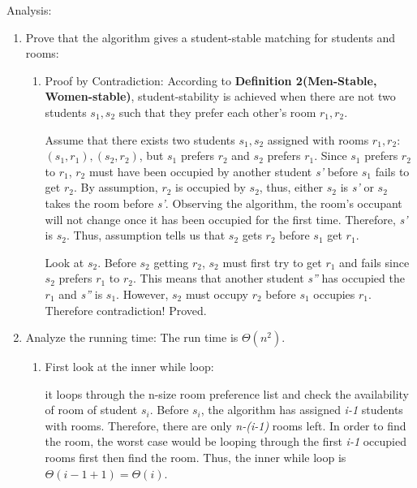 \documentclass{homework}
\begin{document}
\begin{enumerate}
    Analysis:
    \begin{enumerate}
        \item Prove that the algorithm gives a student-stable matching for students and rooms:

        \begin{enumerate}
            \item Proof by Contradiction:
            According to \textbf{Definition 2(Men-Stable, Women-stable)}, student-stability is achieved when there are not two students \textit{$s_1, s_2$} such that they prefer each other's room \textit{$r_1, r_2$}.
        
            Assume that there exists two students \textit{$s_1, s_2$} assigned with rooms \textit{$r_1, r_2$}: \textit{$(s_1, r_1), (s_2, r_2)$}, but \textit{$s_1$} prefers \textit{$r_2$} and \textit{$s_2$} prefers \textit{$r_1$}. Since \textit{$s_1$} prefers \textit{$r_2$} to \textit{$r_1$}, \textit{$r_2$} must have been occupied by another student \textit{s'} before \textit{$s_1$} fails to get \textit{$r_2$}. By assumption, \textit{$r_2$} is occupied by \textit{$s_2$}, thus, either \textit{$s_2$} is \textit{s'} or \textit{$s_2$} takes the room before \textit{s'}. Observing the algorithm, the room's occupant will not change once it has been occupied for the first time. Therefore, \textit{s'} is \textit{$s_2$}. Thus, assumption tells us that \textit{$s_2$} gets \textit{$r_2$} before \textit{$s_1$} get \textit{$r_1$}.
        
            Look at \textit{$s_2$}. Before \textit{$s_2$} getting \textit{$r_2$}, \textit{$s_2$} must first try to get \textit{$r_1$} and fails since \textit{$s_2$} prefers \textit{$r_1$} to \textit{$r_2$}. This means that another student \textit{s''} has occupied the \textit{$r_1$} and \textit{s''} is \textit{$s_1$}. However, \textit{$s_2$} must occupy \textit{$r_2$} before \textit{$s_1$} occupies \textit{$r_1$}. Therefore contradiction! Proved.

        \end{enumerate}
        

        \item Analyze the running time:
        The run time is $\Theta(n^2)$.
        \begin{enumerate}
            \item First look at the inner while loop:

            it loops through the n-size room preference list and check the availability of room of student \textit{$s_i$}. Before \textit{$s_i$}, the algorithm has assigned \textit{i-1} students with rooms. Therefore, there are only \textit{n-(i-1)} rooms left. In order to find the room, the worst case would be looping through the first \textit{i-1} occupied rooms first then find the room. Thus, the inner while loop is $\Theta(i-1+1) = \Theta(i)$.


\end{enumerate}
\end{enumerate}
\end{enumerate}
\end{document}
